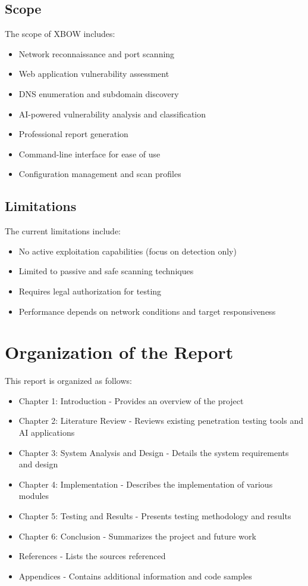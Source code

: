 \documentclass[12pt,a4paper]{report}
\begin{document}
\subsection{Scope}

The scope of XBOW includes:

\begin{itemize}
    \item Network reconnaissance and port scanning
    \item Web application vulnerability assessment
    \item DNS enumeration and subdomain discovery
    \item AI-powered vulnerability analysis and classification
    \item Professional report generation
    \item Command-line interface for ease of use
    \item Configuration management and scan profiles
\end{itemize}

\subsection{Limitations}

The current limitations include:

\begin{itemize}
    \item No active exploitation capabilities (focus on detection only)
    \item Limited to passive and safe scanning techniques
    \item Requires legal authorization for testing
    \item Performance depends on network conditions and target responsiveness
\end{itemize}

\section{Organization of the Report}

This report is organized as follows:

\begin{itemize}
    \item Chapter 1: Introduction - Provides an overview of the project
    \item Chapter 2: Literature Review - Reviews existing penetration testing tools and AI applications
    \item Chapter 3: System Analysis and Design - Details the system requirements and design
    \item Chapter 4: Implementation - Describes the implementation of various modules
    \item Chapter 5: Testing and Results - Presents testing methodology and results
    \item Chapter 6: Conclusion - Summarizes the project and future work
    \item References - Lists the sources referenced
    \item Appendices - Contains additional information and code samples
\end{itemize}
\end{document}
